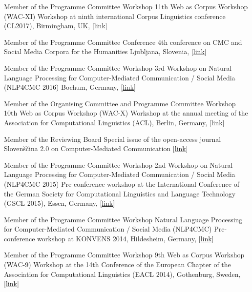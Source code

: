         {Member of the Programme Committee}
        {Workshop}
        {11th Web as Corpus Workshop (WAC-XI)}
        {Workshop at ninth international Corpus Linguistics conference
         (CL2017), Birmingham, UK,
         [\href{https://www.sigwac.org.uk/wiki/WAC-XI}{link}]}
        {}


        {Member of the Programme Committee}
        {Conference}
        {4th conference on CMC and Social Media Corpora for the Humanities}
        {Ljubljana, Slovenia, [\href{http://nl.ijs.si/janes/cmc-corpora2016/}{link}]}
        {}

        {Member of the Programme Committee}
        {Workshop}
        {3rd Workshop on Natural Language Processing for Computer-Mediated Communication /
        Social Media (NLP4CMC 2016)}
        {Bochum, Germany, [\href{https://sites.google.com/site/nlp4cmc2016/}{link}]}
        {}

        {Member of the Organising Committee and Programme Committee}
        {Workshop}
        {10th Web as Corpus Workshop (WAC-X)}
        {Workshop at the annual meeting of the Association for Computational
        Linguistics (ACL), Berlin, Germany,
        [\href{https://www.sigwac.org.uk/wiki/WAC-X}{link}]}
        {}

        {Member of the Reviewing Board} 
        {Special issue of the open-access
         journal Slovenščina 2.0 on Computer-Mediated Communication}
        {} 
        {[\href{http://www.trojina.org/slovenscina2.0/en/}{link}]}
        {}

        {Member of the Programme Committee}
        {Workshop}
        {2nd Workshop on Natural Language Processing for Computer-Mediated Communication /
        Social Media (NLP4CMC 2015)}
        {Pre-conference workshop at the International Conference of the German
        Society for Computational Linguistics and Language Technology
        (GSCL-2015), Essen, Germany, [\href{https://sites.google.com/site/nlp4cmc2015/}{link}]}
        {}

        {Member of the Programme Committee}
        {Workshop}
        {Natural Language Processing for Computer-Mediated Communication /
        Social Media (NLP4CMC)}
        {Pre-conference workshop at KONVENS 2014, Hildesheim, Germany,
        [\href{https://sites.google.com/site/nlp4cmc/}{link}]}
        {}

        {Member of the Programme Committee}
        {Workshop}
        {9th Web as Corpus Workshop (WAC-9)}
        {Workshop at the 14th Conference of the European Chapter of the
        Association for Computational Linguistics (EACL 2014), Gothenburg,
        Sweden, [\href{https://sigwac.org.uk/wiki/WAC9}{link}]}
        {}

